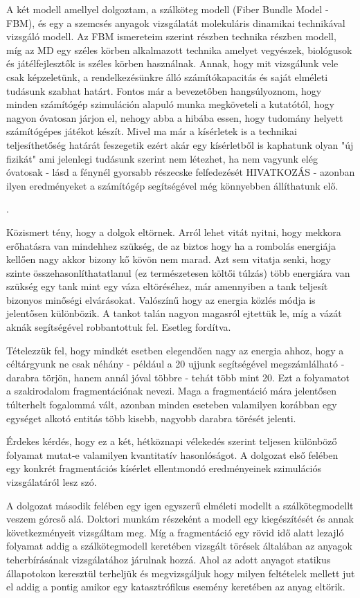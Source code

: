 A két modell amellyel dolgoztam, a szálköteg modell (Fiber Bundle Model - FBM), és egy a szemcsés anyagok vizsgálatát molekuláris dinamikai technikával vizsgáló modell. Az FBM ismereteim szerint részben technika részben modell, míg az MD egy széles körben alkalmazott technika amelyet vegyészek, biológusok és játélfejlesztők is széles körben használnak. Annak, hogy mit vizsgálunk vele csak képzeletünk, a rendelkezésünkre álló számítókapacitás és saját elméleti tudásunk szabhat határt. Fontos már a bevezetőben hangsúlyoznom, hogy minden számítógép szimuláción alapuló munka megköveteli a kutatótól, hogy nagyon óvatosan járjon el, nehogy abba a hibába essen, hogy tudomány helyett számítógépes játékot készít.
Mivel ma már a kísérletek is a technikai teljesíthetőség határát feszegetik ezért akár egy kísérletből is kaphatunk olyan "új fizikát" ami jelenlegi tudásunk szerint nem létezhet, ha nem vagyunk elég óvatosak - lásd a fénynél gyorsabb részecske felfedezését HIVATKOZÁS - azonban ilyen eredményeket a számítógép segítségével még könnyebben állíthatunk elő.


. 


Közismert tény, hogy a dolgok eltörnek. Arról lehet vitát nyitni, hogy mekkora erőhatásra van mindehhez szükség, de az biztos hogy ha a rombolás energiája kellően nagy akkor bizony kő kövön nem marad. Azt sem vitatja senki, hogy szinte összehasonlíthatatlanul (ez természetesen költői túlzás) több energiára van szükség egy tank mint egy váza eltöréséhez, már amennyiben a tank teljesít bizonyos minőségi elvárásokat. Valószínű hogy az energia közlés módja is jelentősen különbözik. A tankot talán nagyon magasról ejtettük le, míg a vázát aknák segítségével robbantottuk fel. Esetleg fordítva.

Tételezzük fel, hogy mindkét esetben elegendően nagy az energia ahhoz, hogy a céltárgyunk ne csak néhány - például a 20 ujjunk segítségével megszámlálható - darabra törjön, hanem annál jóval többre - tehát több mint 20. Ezt a folyamatot a szakirodalom fragmentációnak nevezi. Maga a fragmentáció mára jelentősen túlterhelt fogalommá vált, azonban minden eseteben valamilyen korábban egy egységet alkotó entitás több kisebb, nagyobb darabra törését jelenti. 

Érdekes kérdés, hogy ez a két, hétköznapi vélekedés szerint teljesen különböző folyamat mutat-e valamilyen kvantitatív hasonlóságot. A dolgozat első felében egy konkrét fragmentációs kísérlet ellentmondó eredményeinek szimulációs vizsgálatáról lesz szó.

A dolgozat második felében egy igen egyszerű elméleti modellt a szálkötegmodellt veszem górcső alá. Doktori munkám részeként a modell egy kiegészítését és annak következményeit vizsgáltam meg. Míg a fragmentáció egy rövid idő alatt lezajló folyamat addig a szálkötegmodell keretében vizsgált törések általában az anyagok teherbírásának vizsgálatához járulnak hozzá. Ahol az adott anyagot statikus állapotokon keresztül terheljük és megvizsgáljuk hogy milyen feltételek mellett jut el addig a pontig amikor egy katasztrófikus esemény keretében az anyag eltörik. 

